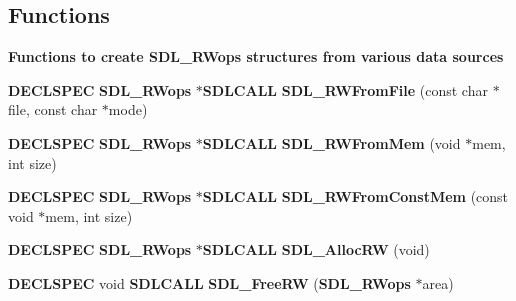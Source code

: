 \subsection*{Functions}
\begin{Indent}{\bf Functions to create S\+D\+L\+\_\+\+R\+Wops structures from various data sources}\par
\begin{DoxyCompactItemize}
\item 
{\bf D\+E\+C\+L\+S\+P\+E\+C} {\bf S\+D\+L\+\_\+\+R\+Wops} $\ast${\bf S\+D\+L\+C\+A\+L\+L} {\bfseries S\+D\+L\+\_\+\+R\+W\+From\+File} (const char $\ast$file, const char $\ast$mode)\label{_s_d_l__rwops_8h_aef7e843c3486bd1770667a594aa0b439}

\item 
{\bf D\+E\+C\+L\+S\+P\+E\+C} {\bf S\+D\+L\+\_\+\+R\+Wops} $\ast${\bf S\+D\+L\+C\+A\+L\+L} {\bfseries S\+D\+L\+\_\+\+R\+W\+From\+Mem} (void $\ast$mem, int size)\label{_s_d_l__rwops_8h_ae6f34841ce63d08597477558ffc0278e}

\item 
{\bf D\+E\+C\+L\+S\+P\+E\+C} {\bf S\+D\+L\+\_\+\+R\+Wops} $\ast${\bf S\+D\+L\+C\+A\+L\+L} {\bfseries S\+D\+L\+\_\+\+R\+W\+From\+Const\+Mem} (const void $\ast$mem, int size)\label{_s_d_l__rwops_8h_a51b4be80c4647e8a473b6b9fed03b1a6}

\item 
{\bf D\+E\+C\+L\+S\+P\+E\+C} {\bf S\+D\+L\+\_\+\+R\+Wops} $\ast${\bf S\+D\+L\+C\+A\+L\+L} {\bfseries S\+D\+L\+\_\+\+Alloc\+R\+W} (void)\label{_s_d_l__rwops_8h_a02d04e13c85cd28706b8c3881c32dd46}

\item 
{\bf D\+E\+C\+L\+S\+P\+E\+C} void {\bf S\+D\+L\+C\+A\+L\+L} {\bfseries S\+D\+L\+\_\+\+Free\+R\+W} ({\bf S\+D\+L\+\_\+\+R\+Wops} $\ast$area)\label{_s_d_l__rwops_8h_ac4c87c7bed186ea1a98531164ff1acfa}

\end{DoxyCompactItemize}
\end{Indent}
